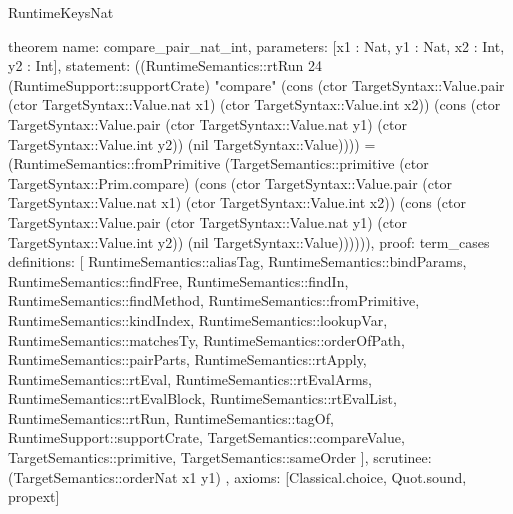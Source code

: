 \begin{lexlean}{RuntimeKeysNat}
\begin{semanticmodule}
theorem{
  name: compare_pair_nat_int,
  parameters: [x1 : Nat, y1 : Nat, x2 : Int, y2 : Int],
  statement: ((RuntimeSemantics::rtRun 24 (RuntimeSupport::supportCrate) "compare" (cons (ctor TargetSyntax::Value.pair (ctor TargetSyntax::Value.nat x1) (ctor TargetSyntax::Value.int x2)) (cons (ctor TargetSyntax::Value.pair (ctor TargetSyntax::Value.nat y1) (ctor TargetSyntax::Value.int y2)) (nil TargetSyntax::Value)))) = (RuntimeSemantics::fromPrimitive (TargetSemantics::primitive (ctor TargetSyntax::Prim.compare) (cons (ctor TargetSyntax::Value.pair (ctor TargetSyntax::Value.nat x1) (ctor TargetSyntax::Value.int x2)) (cons (ctor TargetSyntax::Value.pair (ctor TargetSyntax::Value.nat y1) (ctor TargetSyntax::Value.int y2)) (nil TargetSyntax::Value)))))),
  proof: term_cases{
    definitions: [
      RuntimeSemantics::aliasTag,
      RuntimeSemantics::bindParams,
      RuntimeSemantics::findFree,
      RuntimeSemantics::findIn,
      RuntimeSemantics::findMethod,
      RuntimeSemantics::fromPrimitive,
      RuntimeSemantics::kindIndex,
      RuntimeSemantics::lookupVar,
      RuntimeSemantics::matchesTy,
      RuntimeSemantics::orderOfPath,
      RuntimeSemantics::pairParts,
      RuntimeSemantics::rtApply,
      RuntimeSemantics::rtEval,
      RuntimeSemantics::rtEvalArms,
      RuntimeSemantics::rtEvalBlock,
      RuntimeSemantics::rtEvalList,
      RuntimeSemantics::rtRun,
      RuntimeSemantics::tagOf,
      RuntimeSupport::supportCrate,
      TargetSemantics::compareValue,
      TargetSemantics::primitive,
      TargetSemantics::sameOrder
    ],
    scrutinee: (TargetSemantics::orderNat x1 y1)
  },
  axioms: [Classical.choice, Quot.sound, propext]
}


\end{semanticmodule}
\end{lexlean}
